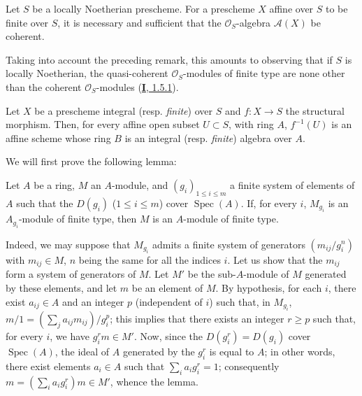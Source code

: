 \begin{proposition}[6.1.3]
\label{II.6.1.3}
Let $S$ be a locally Noetherian prescheme. For a prescheme $X$ affine over
$S$ to be finite over $S$, it is necessary and sufficient that the
$\mathcal{O}_S$-algebra $\mathcal{A}(X)$ be coherent.
\end{proposition}

Taking into account the preceding remark, this amounts to observing that if
$S$ is locally Noetherian, the quasi-coherent $\mathcal{O}_S$-modules of
finite type are none other than the coherent $\mathcal{O}_S$-modules
(\hyperref[I.1.5.1]{\textbf{I}, 1.5.1}).

\begin{proposition}[6.1.4]
\label{II.6.1.4}
Let $X$ be a prescheme integral \textup{(resp. \emph{finite})} over $S$ and $f:X\to S$ the
structural morphism. Then, for every affine open subset $U\subset S$, with
ring $A$, $f^{-1}(U)$ is an affine scheme whose ring $B$ is an integral
\textup{(resp. \emph{finite})} algebra over $A$.
\end{proposition}


We will first prove the following lemma:

\begin{lemma}[6.1.4.1]
\label{II.6.1.4.1}
Let $A$ be a ring, $M$ an $A$-module, and $(g_i)_{1\leq i\leq m}$ a finite
system of elements of $A$ such that the $D(g_i)$ ($1\leq i\leq m$) cover
$\operatorname{Spec}(A)$. If, for every $i$, $M_{g_i}$ is an
$A_{g_i}$-module of finite type, then $M$ is an $A$-module of finite type.
\end{lemma}

Indeed, we may suppose that $M_{g_i}$ admits a finite system of generators
$(m_{ij}/g_i^n)$ with $m_{ij}\in M$, $n$ being the same for all the indices
$i$. Let us show that the $m_{ij}$ form a system of generators of $M$. Let
$M'$ be the sub-$A$-module of $M$ generated by these elements, and let $m$ be
an element of $M$. By hypothesis, for each $i$, there exist $a_{ij}\in A$ and
an integer $p$ (independent of $i$) such that, in $M_{g_i}$,
$m/1=(\sum_j a_{ij}m_{ij})/g_i^p$; this implies that there exists an integer
$r\geq p$ such that, for every $i$, we have $g_i^r m\in M'$. Now, since the
$D(g_i^r)=D(g_i)$ cover $\operatorname{Spec}(A)$, the ideal of $A$
generated by the $g_i^r$ is equal to $A$; in other words, there exist
elements $a_i\in A$ such that $\sum_i a_i g_i^r=1$; consequently
$m=(\sum_i a_i g_i^r)m\in M'$, whence the lemma.

